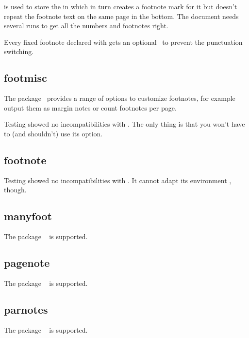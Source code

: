 \documentclass{fnpct-manual}
\begin{document}
 is used to store
the  in  which in turn creates a footnote mark for
it but doesn't repeat the footnote text on the same page in the bottom.  The
document needs several runs to get all the numbers and footnotes right.

Every fixed footnote declared with  gets an optional
\sarg\ to prevent the punctuation switching.


\subsection{footmisc}\label{sec:footmisc}
The  package~\cite{pkg:footmisc} provides a range of options to
customize footnotes, for example output them as margin notes or count
footnotes per page.

Testing showed no incompatibilities with .  The only thing is
that you won't have to (and shouldn't) use its  option.

\subsection{footnote}\label{sec:footnote}

Testing showed no incompatibilities with .  It cannot adapt its
environment , though.

\subsection{manyfoot}\label{sec:manyfoot}
The package ~\cite{pkg:manyfoot} is supported.

\subsection{pagenote}\label{sec:pagenote}
The package ~\cite{pkg:pagenote} is supported.


\subsection{parnotes}\label{sec:parnotes}
The package ~\cite{pkg:parnotes} is supported.

\end{document}
